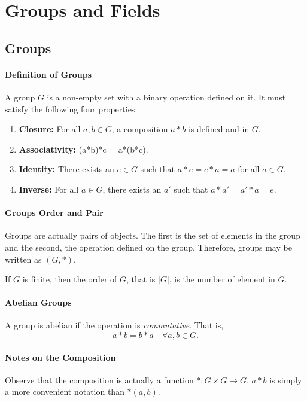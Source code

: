 
\section{Groups and Fields}

\subsection{Groups}

\paragraph{Definition of Groups}
A group \(G\) is a non-empty set with a binary operation defined on it.
It must satisfy the following four properties:
\begin{enumerate}
    \item \textbf{Closure:} For all \(a, b \in G\), a composition \(a*b\) is
    defined and in \(G\).
    \item \textbf{Associativity:} (a*b)*c = a*(b*c).
    \item \textbf{Identity:} There exists an \(e\in G\) such that
    \(a*e = e*a = a\)  for all \(a\in G\).
    \item \textbf{Inverse:} For all \(a \in G\), there exists an \(a'\)
    such that \(a*a' = a'*a = e\).
\end{enumerate}

\paragraph{Groups Order and Pair}
Groups are actually pairs of objects. The first is the set of elements in
the group and the second, the operation defined on the group.
Therefore, groups may be written as \((G, *)\).

If \(G\) is finite, then the order of \(G\), that is \(|G|\), is the
number of element in \(G\).

\paragraph{Abelian Groups}
A group is abelian if the operation is \textit{commutative}.
That is,
\[a*b = b*a \quad \forall a,b\in G.\]

\paragraph{Notes on the Composition}

Observe that the composition is actually a function \(*: G\times G \to G\).
\(a*b\) is simply a more convenient notation than \(*(a, b)\).


